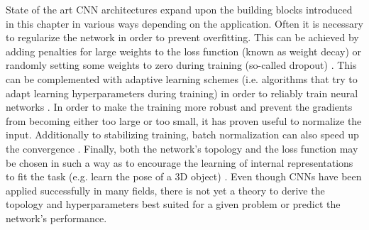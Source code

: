 State of the art CNN architectures expand upon the building blocks introduced in this chapter in various ways depending on the application. Often it is necessary to regularize the network in order to prevent overfitting. This can be achieved by adding penalties for large weights to the loss function (known as weight decay) or randomly setting some weights to zero during training (so-called dropout) \cite{srivastava2014dropout,pmlr-v28-wan13,krogh1992simple,treadgold1998simulated}. This can be complemented with adaptive learning schemes (i.e. algorithms that try to adapt learning hyperparameters during training) in order to reliably train neural networks \cite{zeiler2012adadelta,duchi2011adaptive,kingma2014adam,polyak1992acceleration,graves2013generating,sutskever2013importance,loshchilov2016sgdr}. In order to make the training more robust and prevent the gradients from becoming either too large or too small, it has proven useful to normalize the input. Additionally to stabilizing training, batch normalization can also speed up the convergence \cite{ba2016layer,ioffe2015batch,salimans2016weight}. Finally, both the network's topology and the loss function may be chosen in such a way as to encourage the learning of internal representations to fit the task (e.g. learn the pose of a 3D object) \cite{worrall2018cubenet,worrall2017harmonic,schmidt2012learning,cohen2016group}. Even though CNNs have been applied successfully in many fields, there is not yet a theory to derive the topology and hyperparameters best suited for a given problem or predict the network's performance.

